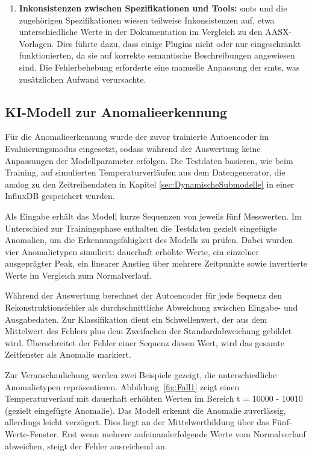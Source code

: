 \begin{enumerate}
    \item \textbf{Inkonsistenzen zwischen Spezifikationen und Tools:}  
    \acsp{smt} und die zugehörigen Spezifikationen wiesen teilweise Inkonsistenzen auf, etwa unterschiedliche Werte in der Dokumentation im Vergleich zu den AASX-Vorlagen.  
    Dies führte dazu, dass einige Plugins nicht oder nur eingeschränkt funktionierten, da sie auf korrekte semantische Beschreibungen angewiesen sind.  
    Die Fehlerbehebung erforderte eine manuelle Anpassung der \acsp{smt}, was zusätzlichen Aufwand verursachte.
\end{enumerate}

\newpage
\subsection{KI-Modell zur Anomalieerkennung}

Für die Anomalieerkennung wurde der zuvor trainierte Autoencoder im Evaluierungsmodus eingesetzt, sodass während der Auswertung keine Anpassungen der Modellparameter erfolgen.
Die Testdaten basieren, wie beim Training, auf simulierten Temperaturverläufen aus dem Datengenerator, die analog zu den Zeitreihendaten in Kapitel \ref{sec:DynamischeSubmodelle} in einer InfluxDB gespeichert wurden.

Als Eingabe erhält das Modell kurze Sequenzen von jeweils fünf Messwerten.
Im Unterschied zur Trainingsphase enthalten die Testdaten gezielt eingefügte Anomalien, um die Erkennungsfähigkeit des Modells zu prüfen.
Dabei wurden vier Anomalietypen simuliert: dauerhaft erhöhte Werte, ein einzelner ausgeprägter Peak, ein linearer Anstieg über mehrere Zeitpunkte sowie invertierte Werte im Vergleich zum Normalverlauf.

Während der Auswertung berechnet der Autoencoder für jede Sequenz den Rekonstruktionsfehler als durchschnittliche Abweichung zwischen Eingabe- und Ausgabedaten. 
Zur Klassifikation dient ein Schwellenwert, der aus dem Mittelwert des Fehlers plus dem Zweifachen der Standardabweichung gebildet wird. 
Überschreitet der Fehler einer Sequenz diesen Wert, wird das gesamte Zeitfenster als Anomalie markiert.

Zur Veranschaulichung werden zwei Beispiele gezeigt, die unterschiedliche Anomalietypen repräsentieren. 
Abbildung~\ref{fig:Fall1} zeigt einen Temperaturverlauf mit dauerhaft erhöhten Werten im Bereich t = 10000 - 10010 (gezielt eingefügte Anomalie). 
Das Modell erkennt die Anomalie zuverlässig, allerdings leicht verzögert. 
Dies liegt an der Mittelwertbildung über das Fünf-Werte-Fenster.
Erst wenn mehrere aufeinanderfolgende Werte vom Normalverlauf abweichen, steigt der Fehler ausreichend an.


